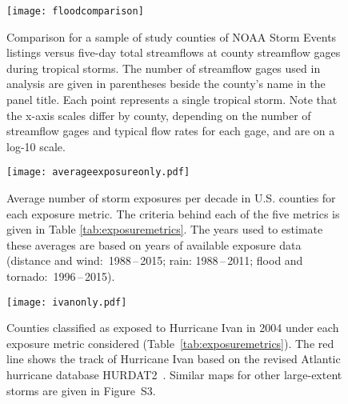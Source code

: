 \begin{figure}[tbhp!]
\centering
\texttt{[image: floodcomparison]}
\caption{Comparison for a sample of study counties of NOAA Storm Events
listings versus five-day total streamflows at county streamflow gages during
tropical storms. The number of streamflow gages used in analysis are given in
parentheses beside the county's name in the panel title. Each point represents
a single tropical storm. Note that the x-axis scales differ by county,
depending on the number of streamflow gages and typical flow rates for each
gage, and are on a log-10 scale.}
\label{fig:floodcomparison}
\end{figure}

\clearpage

\begin{figure}%
\centering
\texttt{[image: averageexposureonly.pdf]} 
\caption{Average number of storm exposures per decade in U.S. counties for each
exposure metric. The criteria behind each of the five metrics is given in Table
\ref{tab:exposuremetrics}. The years used to estimate these averages are based
on years of available exposure data (distance and wind:~1988\,--\,2015; rain:
1988\,--\,2011; flood and tornado:~1996\,--\,2015). } 
\label{fig:averageexposure} 
\end{figure}

\clearpage

\begin{figure}%
\centering
\texttt{[image: ivanonly.pdf]}
\caption{Counties classified as exposed to Hurricane Ivan in 2004 under each
exposure metric considered (Table~\ref{tab:exposuremetrics}). The red line
shows the track of Hurricane Ivan based on the revised Atlantic hurricane
database \ac{HURDAT2}~\parencite{landsea2013}.  Similar maps for other
large-extent storms are given in Figure~S3.}
\label{fig:ivanexposure} 
\end{figure}

\clearpage


